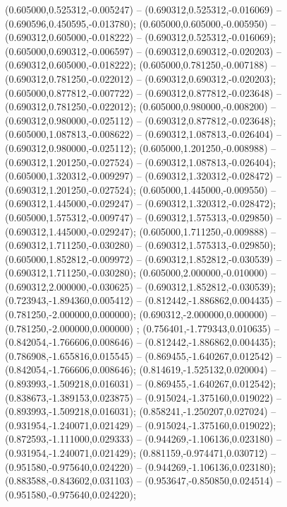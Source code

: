  (0.605000,0.525312,-0.005247) -- (0.690312,0.525312,-0.016069) -- (0.690596,0.450595,-0.013780);
 (0.605000,0.605000,-0.005950) -- (0.690312,0.605000,-0.018222) -- (0.690312,0.525312,-0.016069);
 (0.605000,0.690312,-0.006597) -- (0.690312,0.690312,-0.020203) -- (0.690312,0.605000,-0.018222);
 (0.605000,0.781250,-0.007188) -- (0.690312,0.781250,-0.022012) -- (0.690312,0.690312,-0.020203);
 (0.605000,0.877812,-0.007722) -- (0.690312,0.877812,-0.023648) -- (0.690312,0.781250,-0.022012);
 (0.605000,0.980000,-0.008200) -- (0.690312,0.980000,-0.025112) -- (0.690312,0.877812,-0.023648);
 (0.605000,1.087813,-0.008622) -- (0.690312,1.087813,-0.026404) -- (0.690312,0.980000,-0.025112);
 (0.605000,1.201250,-0.008988) -- (0.690312,1.201250,-0.027524) -- (0.690312,1.087813,-0.026404);
 (0.605000,1.320312,-0.009297) -- (0.690312,1.320312,-0.028472) -- (0.690312,1.201250,-0.027524);
 (0.605000,1.445000,-0.009550) -- (0.690312,1.445000,-0.029247) -- (0.690312,1.320312,-0.028472);
 (0.605000,1.575312,-0.009747) -- (0.690312,1.575313,-0.029850) -- (0.690312,1.445000,-0.029247);
 (0.605000,1.711250,-0.009888) -- (0.690312,1.711250,-0.030280) -- (0.690312,1.575313,-0.029850);
 (0.605000,1.852812,-0.009972) -- (0.690312,1.852812,-0.030539) -- (0.690312,1.711250,-0.030280);
 (0.605000,2.000000,-0.010000) -- (0.690312,2.000000,-0.030625) -- (0.690312,1.852812,-0.030539);
 (0.723943,-1.894360,0.005412) -- (0.812442,-1.886862,0.004435) -- (0.781250,-2.000000,0.000000);
 (0.690312,-2.000000,0.000000) -- (0.781250,-2.000000,0.000000) ;
 (0.756401,-1.779343,0.010635) -- (0.842054,-1.766606,0.008646) -- (0.812442,-1.886862,0.004435);
 (0.786908,-1.655816,0.015545) -- (0.869455,-1.640267,0.012542) -- (0.842054,-1.766606,0.008646);
 (0.814619,-1.525132,0.020004) -- (0.893993,-1.509218,0.016031) -- (0.869455,-1.640267,0.012542);
 (0.838673,-1.389153,0.023875) -- (0.915024,-1.375160,0.019022) -- (0.893993,-1.509218,0.016031);
 (0.858241,-1.250207,0.027024) -- (0.931954,-1.240071,0.021429) -- (0.915024,-1.375160,0.019022);
 (0.872593,-1.111000,0.029333) -- (0.944269,-1.106136,0.023180) -- (0.931954,-1.240071,0.021429);
 (0.881159,-0.974471,0.030712) -- (0.951580,-0.975640,0.024220) -- (0.944269,-1.106136,0.023180);
 (0.883588,-0.843602,0.031103) -- (0.953647,-0.850850,0.024514) -- (0.951580,-0.975640,0.024220);

